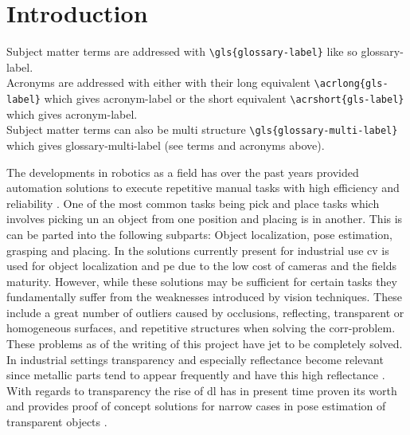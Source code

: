 \chapter{Introduction} \label{ch:intro}

Subject matter terms are addressed with \texttt{\textbackslash gls\{glossary-label\}} like so \gls{glossary-label}. \\
Acronyms are addressed with either with their long equivalent \texttt{\textbackslash acrlong\{gls-label\}} which gives \acrlong{acronym-label}
or the short equivalent \texttt{\textbackslash acrshort\{gls-label\}} which gives \acrshort{acronym-label}. \\
Subject matter terms can also be multi structure \texttt{\textbackslash gls\{glossary-multi-label\}} which gives \gls{glossary-multi-label} (see terms and acronyms above). \medskip

The developments in robotics as a field has over the past years provided automation solutions to execute repetitive manual tasks with high efficiency and reliability \fakecite. One of the most common tasks being pick and place tasks which involves picking un an object from one position and placing is in another. This is can be parted into the following subparts: Object localization, pose estimation, grasping and placing. In the solutions currently present for industrial use \gls{cv} is used for object localization and \gls{pe} due to the low cost of cameras and the fields maturity. However, while these solutions may be sufficient for certain tasks they fundamentally suffer from the weaknesses introduced by vision techniques. These include a great number of outliers caused by occlusions, reflecting, transparent or homogeneous surfaces, and repetitive structures when solving the \gls{corr-problem}. These problems as of the writing of this project have jet to be completely solved. In industrial settings transparency and especially reflectance become relevant since metallic parts 
tend to appear frequently and have this high reflectance \fakecite. With regards to transparency the rise of \gls{dl} has in present time proven its worth and provides proof of concept solutions for narrow cases in pose estimation of transparent objects \cite{6dof-pose-estimation-of-transparent-object-from-a-single-rgb-d-image}.




